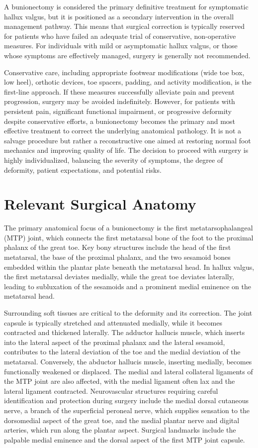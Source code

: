 A bunionectomy is considered the primary definitive treatment for symptomatic hallux valgus, but it is positioned as a secondary intervention in the overall management pathway. This means that surgical correction is typically reserved for patients who have failed an adequate trial of conservative, non-operative measures. For individuals with mild or asymptomatic hallux valgus, or those whose symptoms are effectively managed, surgery is generally not recommended.

Conservative care, including appropriate footwear modifications (wide toe box, low heel), orthotic devices, toe spacers, padding, and activity modification, is the first-line approach. If these measures successfully alleviate pain and prevent progression, surgery may be avoided indefinitely. However, for patients with persistent pain, significant functional impairment, or progressive deformity despite conservative efforts, a bunionectomy becomes the primary and most effective treatment to correct the underlying anatomical pathology. It is not a salvage procedure but rather a reconstructive one aimed at restoring normal foot mechanics and improving quality of life. The decision to proceed with surgery is highly individualized, balancing the severity of symptoms, the degree of deformity, patient expectations, and potential risks.

\section*{Relevant Surgical Anatomy}
The primary anatomical focus of a bunionectomy is the first metatarsophalangeal (MTP) joint, which connects the first metatarsal bone of the foot to the proximal phalanx of the great toe. Key bony structures include the head of the first metatarsal, the base of the proximal phalanx, and the two sesamoid bones embedded within the plantar plate beneath the metatarsal head. In hallux valgus, the first metatarsal deviates medially, while the great toe deviates laterally, leading to subluxation of the sesamoids and a prominent medial eminence on the metatarsal head.

Surrounding soft tissues are critical to the deformity and its correction. The joint capsule is typically stretched and attenuated medially, while it becomes contracted and thickened laterally. The adductor hallucis muscle, which inserts into the lateral aspect of the proximal phalanx and the lateral sesamoid, contributes to the lateral deviation of the toe and the medial deviation of the metatarsal. Conversely, the abductor hallucis muscle, inserting medially, becomes functionally weakened or displaced. The medial and lateral collateral ligaments of the MTP joint are also affected, with the medial ligament often lax and the lateral ligament contracted. Neurovascular structures requiring careful identification and protection during surgery include the medial dorsal cutaneous nerve, a branch of the superficial peroneal nerve, which supplies sensation to the dorsomedial aspect of the great toe, and the medial plantar nerve and digital arteries, which run along the plantar aspect. Surgical landmarks include the palpable medial eminence and the dorsal aspect of the first MTP joint capsule.

